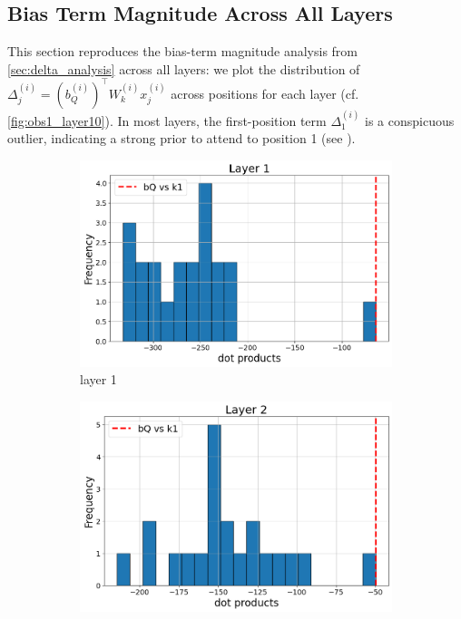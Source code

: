 \documentclass[11pt]{article}
\begin{document}
\subsection{Bias Term Magnitude Across All Layers}\label{app:bias_term}

This section reproduces the bias-term magnitude analysis from \cref{sec:delta_analysis} across all layers: we plot the distribution of $\Delta_j^{(i)}=(b_Q^{(i)})^\top W_k^{(i)} x_j^{(i)}$ across positions for each layer (cf. \cref{fig:obs1_layer10}). In most layers, the first-position term $\Delta_1^{(i)}$ is a conspicuous outlier, indicating a strong prior to attend to position 1 (see ).

\begin{figure}[t]
  \begin{subfigure}[t]{0.24\textwidth}
    \centering
    \includegraphics[width=1.4\columnwidth]{figures/obs1_appendix/obs1_layer1.png}
    \caption{layer 1}
  \end{subfigure}\hfill
  \begin{subfigure}[t]{0.24\textwidth}
    \centering
    \includegraphics[width=1.4\columnwidth]{figures/obs1_appendix/obs1_layer2.png}

\end{subfigure}
\end{figure}
\end{document}
